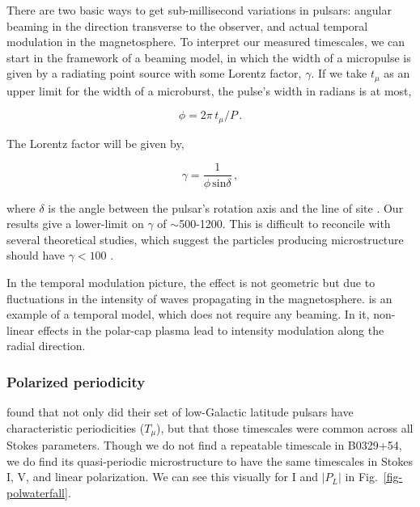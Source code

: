 There are two basic ways to get sub-millisecond 
variations in pulsars: angular beaming in the 
direction transverse to the observer, and actual temporal 
modulation in the magnetosphere.  
To interpret our measured timescales, we can start 
in the framework of a beaming model, in which 
the width of a micropulse is given by a 
radiating point source with some Lorentz factor, $\gamma$.
If we take $t_\mu$ as an upper limit for the 
width of a microburst, the pulse's width in radians is 
at most,

\begin{equation}
\phi = 2 \pi \, t_\mu / P\,.
\end{equation}

\noindent The Lorentz factor will be given by,

\begin{equation}
\gamma = \frac{1}{\phi\, \textrm{sin}\delta}\,,
\end{equation}

\noindent where $\delta$ is the angle between 
the pulsar's rotation axis and the line of site \citep{1998A&A...332..111L}.
Our results give a lower-limit on $\gamma$ of 
$\sim$500-1200. This is difficult to reconcile 
with several theoretical studies, which suggest 
the particles producing microstructure should have
$\gamma<100$ \citep{1992msem.coll..322A, 1998A&A...332..111L}.

In the temporal modulation picture, the effect
is not geometric but due to fluctuations in 
the intensity of waves propagating in the magnetosphere.
\citet{1983Ap&SS..97....9C} is an example of a temporal model, which 
does not require any beaming. In it, non-linear effects 
in the polar-cap plasma lead to intensity modulation 
along the radial direction.

\subsubsection{Polarized periodicity}

\citet{2015ApJ...806..236M} found that not only did 
their set of low-Galactic latitude pulsars 
have characteristic periodicities ($T_\mu$), but that 
those timescales were common across all Stokes 
parameters. Though we do not find a repeatable 
timescale in B0329+54, we do find its 
quasi-periodic microstructure to have the same 
timescales in Stokes I, V, and linear polarization.
We can see this visually 
for I and $|P_L|$ in Fig.~\ref{fig-polwaterfall}.

